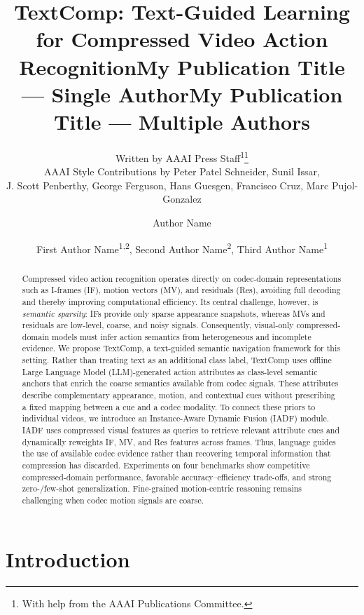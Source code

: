 \documentclass[letterpaper]{article} %
\title{TextComp: Text-Guided Learning for Compressed Video Action Recognition} %
\author{
    Written by AAAI Press Staff\textsuperscript{\rm 1}\thanks{With help from the AAAI Publications Committee.}\\
    AAAI Style Contributions by Peter Patel Schneider,
    Sunil Issar,\\
    J. Scott Penberthy,
    George Ferguson,
    Hans Guesgen,
    Francisco Cruz\equalcontrib\corresponding,
    Marc Pujol-Gonzalez\equalcontrib\corresponding
}
\title{My Publication Title --- Single Author}
\author {
    Author Name
}
\title{My Publication Title --- Multiple Authors}
\author {
    First Author Name\textsuperscript{\rm 1,\rm 2}\equalcontrib,
    Second Author Name\textsuperscript{\rm 2}\equalcontrib,
    Third Author Name\textsuperscript{\rm 1}\corresponding
}
\begin{document}
\maketitle

\begin{abstract}
Compressed video action recognition operates directly on codec-domain representations such as I-frames (IF), motion vectors (MV), and residuals (Res), avoiding full decoding and thereby improving computational efficiency. Its central challenge, however, is \emph{semantic sparsity}: IFs provide only sparse appearance snapshots, whereas MVs and residuals are low-level, coarse, and noisy signals. Consequently, visual-only compressed-domain models must infer action semantics from heterogeneous and incomplete evidence.
We propose TextComp, a text-guided semantic navigation framework for this setting. Rather than treating text as an additional class label, TextComp uses offline Large Language Model (LLM)-generated action attributes as class-level semantic anchors that enrich the coarse semantics available from codec signals. These attributes describe complementary appearance, motion, and contextual cues without prescribing a fixed mapping between a cue and a codec modality.
To connect these priors to individual videos, we introduce an Instance-Aware Dynamic Fusion (IADF) module. IADF uses compressed visual features as queries to retrieve relevant attribute cues and dynamically reweights IF, MV, and Res features across frames. Thus, language guides the use of available codec evidence rather than recovering temporal information that compression has discarded.
Experiments on four benchmarks show competitive compressed-domain performance, favorable accuracy--efficiency trade-offs, and strong zero-/few-shot generalization. Fine-grained motion-centric reasoning remains challenging when codec motion signals are coarse.
\end{abstract}


\section{Introduction}
\label{sec:intro}
\end{document}

